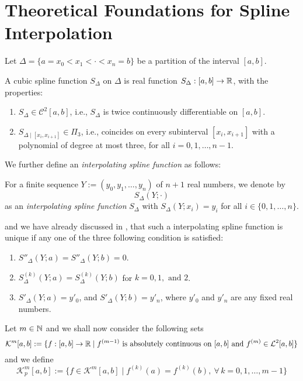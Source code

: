 
\section{Theoretical Foundations for Spline Interpolation}

Let $\Delta = \{a = x_0 < x_1< \cdot < x_n = b\}$ be a partition of the interval $[a,b]$. 

\begin{defn}\label{defn1:mar25A}
    A cubic spline function $S_{\Delta}$ on $\Delta$ is real function $S_{\Delta} : [a,b] \to \mathbb{R}$, with the properties:
    \begin{enumerate}
        \item $S_{\Delta} \in \mathcal{C}^2[a,b]$, i.e., $S_{\Delta}$ is twice continuously differentiable on $[a,b]$. 
        \item $S_{\Delta \mid [x_i, x_{i+1}]} \in \Pi_3$, i.e., coincides on every subinterval $[x_i, x_{i+1}]$ with a polynomial of degree at most three, for all $i = 0,1,\dots,n-1$. 
    \end{enumerate}
\end{defn}

We further define an \textit{interpolating spline function} as follows:
\begin{defn}\label{defn2:mar25A}
    For a finite sequence $Y := (y_0, y_1, \dots, y_n)$ of $n+1$ real numbers, we denote by 
    \[
        S_{\Delta}(Y; \cdot)  
    \]
    as an \textit{interpolating spline function} $S_{\Delta}$ with $S_{\Delta}(Y; x_i) = y_i$ for all $ i \in \{0,1,\dots,n\}$.
\end{defn}

and we have already discussed in , that such a interpolating spline function is unique if any one of the three following condition is satisfied:

\begin{enumerate}[label = (\alph*)]
    \item
      $S''_\Delta(Y ; a) = S''_\Delta(Y ; b) = 0$.
    \item
      $S^{(k)}_\Delta(Y ; a) = S^{(k)}_\Delta(Y ; b)$ for $k = 0, 1, \text{ and } 2$.
    \item
      $S'_\Delta(Y ; a) = y'_0$, and $S'_\Delta(Y ; b) = y'_n$, where $y'_0$ and $y'_n$ are any fixed real numbers.
\end{enumerate}

Let $m \in \mathbb{N}$ and we shall now consider the following sets  
\begin{equation}\label{eq1:mar25A}
    \mathcal{K}^m[a,b] := \{ f : [a,b] \to \mathbb{R} \mid f^{(m-1)} \mbox{ is absolutely continuous on } [a,b] \mbox{ and } f^{(m)} \in \mathcal{L}^2[a,b] \}
\end{equation}
and we define 
\begin{equation}\label{eq2:mar25A}
    \mathcal{K}^m_p [a,b] := \{ f \in \mathcal{K}^m[a,b] \mid f^{(k)}(a) = f^{(k)}(b), \ \forall \, k = 0,1,\dots,m-1 \}
\end{equation}

